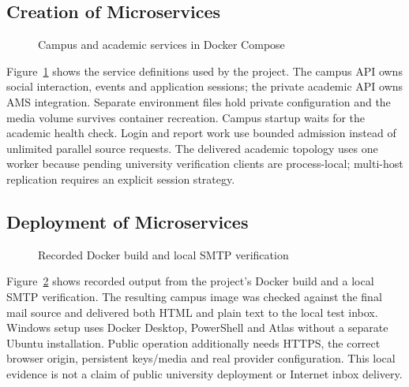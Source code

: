 \documentclass[10pt]{report}
\begin{document}
\subsection{Creation of Microservices}
\begin{figure}[H]\centering
\begin{minipage}[c][100mm][c]{150mm}
\begingroup\linespread{1}\selectfont

\endgroup
\end{minipage}
\caption{Campus and academic services in Docker Compose}\label{fig:services}
\end{figure}
Figure~\ref{fig:services} shows the service definitions used by the project. The campus API owns social interaction, events and application sessions; the private academic API owns AMS integration. Separate environment files hold private configuration and the media volume survives container recreation. Campus startup waits for the academic health check. Login and report work use bounded admission instead of unlimited parallel source requests. The delivered academic topology uses one worker because pending university verification clients are process-local; multi-host replication requires an explicit session strategy.
\clearpage

\subsection{Deployment of Microservices}
\begin{figure}[H]\centering
\begin{minipage}[c][100mm][c]{150mm}
\begingroup\linespread{1}\selectfont

\endgroup
\end{minipage}
\caption{Recorded Docker build and local SMTP verification}\label{fig:deployment}
\end{figure}
Figure~\ref{fig:deployment} shows recorded output from the project's Docker build and a local SMTP verification. The resulting campus image was checked against the final mail source and delivered both HTML and plain text to the local test inbox. Windows setup uses Docker Desktop, PowerShell and Atlas without a separate Ubuntu installation. Public operation additionally needs HTTPS, the correct browser origin, persistent keys/media and real provider configuration. This local evidence is not a claim of public university deployment or Internet inbox delivery.
\end{document}
